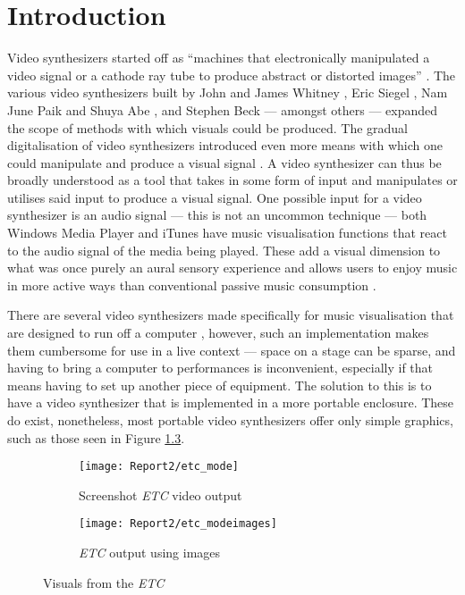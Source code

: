 \documentclass{report}
\begin{document}
\chapter{Introduction}
Video synthesizers started off as ``machines that electronically manipulated a video signal or a cathode ray tube to produce abstract or distorted images'' \cite{Collopy2014}. The various video synthesizers built by John and James Whitney \cite{Patterson2009}, Eric Siegel \cite{ElectronicArtsIntermix}, Nam June Paik and Shuya Abe \cite{Furlong1983}, and Stephen Beck \cite{Beck1992} --- amongst others --- expanded the scope of methods with which visuals could be produced. The gradual digitalisation of video synthesizers introduced even more means with which one could manipulate and produce a visual signal \cite{Collopy2014}. A video synthesizer can thus be broadly understood as a tool that takes in some form of input and manipulates or utilises said input to produce a visual signal. One possible input for a video synthesizer is an audio signal --- this is not an uncommon technique --- both Windows Media Player and iTunes have music visualisation functions that react to the audio signal of the media being played. These add a visual dimension to what was once purely an aural sensory experience and allows users to enjoy music in more active ways than conventional passive music consumption \cite{Casey2008}. \par

There are several video synthesizers made specifically for music visualisation that are designed to run off a computer \cite{Casey2008}, however, such an implementation makes them cumbersome for use in a live context --- space on a stage can be sparse, and having to bring a computer to performances is inconvenient, especially if that means having to set up another piece of equipment. The solution to this is to have a video synthesizer that is implemented in a more portable enclosure. These do exist, nonetheless, most portable video synthesizers offer only simple graphics, such as those seen in Figure \ref{fig:etc}.

\begin{figure}[b]
  \begin{subfigure}{0.5\textwidth}
    \centering
    \texttt{[image: Report2/etc\_mode]}
    \caption{Screenshot \textit{ETC} video output}
    \label{fig:etc_mode}
  \end{subfigure}
  \begin{subfigure}{0.5\textwidth}
    \centering
    \texttt{[image: Report2/etc\_modeimages]}
    \caption{\textit{ETC} output using images}
    \label{fig:etc_modeimages}
  \end{subfigure}
  \caption{Visuals from the \textit{ETC}}
  \label{fig:etc}
\end{figure}
\end{document}
